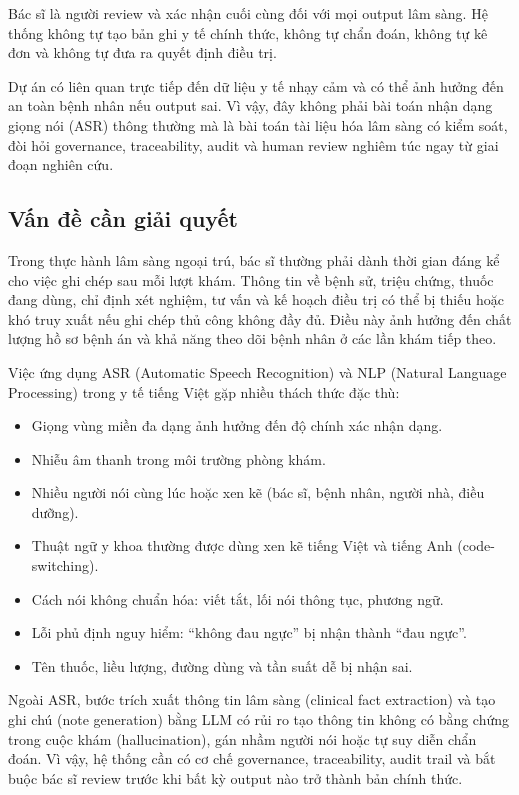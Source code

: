 \documentclass[12pt,a4paper]{article}
\begin{document}
Bác sĩ là người review và xác nhận cuối cùng đối với mọi output lâm sàng. Hệ thống không tự tạo bản ghi y tế chính thức, không tự chẩn đoán, không tự kê đơn và không tự đưa ra quyết định điều trị.

Dự án có liên quan trực tiếp đến dữ liệu y tế nhạy cảm và có thể ảnh hưởng đến an toàn bệnh nhân nếu output sai. Vì vậy, đây không phải bài toán nhận dạng giọng nói (ASR) thông thường mà là bài toán tài liệu hóa lâm sàng có kiểm soát, đòi hỏi governance, traceability, audit và human review nghiêm túc ngay từ giai đoạn nghiên cứu.

\subsection{Vấn đề cần giải quyết}

Trong thực hành lâm sàng ngoại trú, bác sĩ thường phải dành thời gian đáng kể cho việc ghi chép sau mỗi lượt khám. Thông tin về bệnh sử, triệu chứng, thuốc đang dùng, chỉ định xét nghiệm, tư vấn và kế hoạch điều trị có thể bị thiếu hoặc khó truy xuất nếu ghi chép thủ công không đầy đủ. Điều này ảnh hưởng đến chất lượng hồ sơ bệnh án và khả năng theo dõi bệnh nhân ở các lần khám tiếp theo.

Việc ứng dụng ASR (Automatic Speech Recognition) và NLP (Natural Language Processing) trong y tế tiếng Việt gặp nhiều thách thức đặc thù:

\begin{itemize}
    \item Giọng vùng miền đa dạng ảnh hưởng đến độ chính xác nhận dạng.
    \item Nhiễu âm thanh trong môi trường phòng khám.
    \item Nhiều người nói cùng lúc hoặc xen kẽ (bác sĩ, bệnh nhân, người nhà, điều dưỡng).
    \item Thuật ngữ y khoa thường được dùng xen kẽ tiếng Việt và tiếng Anh (code-switching).
    \item Cách nói không chuẩn hóa: viết tắt, lối nói thông tục, phương ngữ.
    \item Lỗi phủ định nguy hiểm: ``không đau ngực'' bị nhận thành ``đau ngực''.
    \item Tên thuốc, liều lượng, đường dùng và tần suất dễ bị nhận sai.
\end{itemize}

Ngoài ASR, bước trích xuất thông tin lâm sàng (clinical fact extraction) và tạo ghi chú (note generation) bằng LLM có rủi ro tạo thông tin không có bằng chứng trong cuộc khám (hallucination), gán nhầm người nói hoặc tự suy diễn chẩn đoán. Vì vậy, hệ thống cần có cơ chế governance, traceability, audit trail và bắt buộc bác sĩ review trước khi bất kỳ output nào trở thành bản chính thức.
\end{document}
